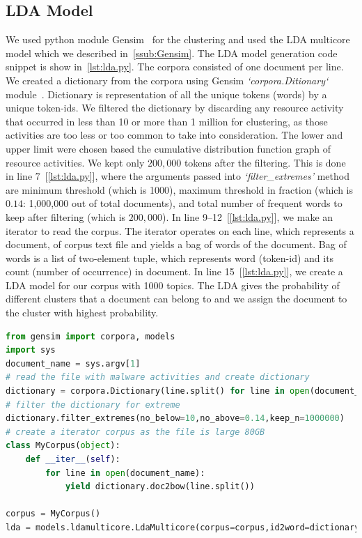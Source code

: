 \subsection{LDA Model}
\label{sub:LDA Model}
We used python module Gensim~\cite[Gensim]{gensim}  for the clustering and used the LDA multicore model which we described in~\autoref{ssub:Gensim}.
The LDA model generation code snippet is show in~\autoref{lst:lda.py}.
The corpora consisted of one document per line.
We created a dictionary from the corpora using Gensim \emph{`corpora.Ditionary`} module~\cite[]{gensimdict}.
Dictionary is representation of all the unique tokens (words) by a unique token-ids.
We filtered the dictionary by discarding any resource activity that occurred in less than 10 or more than 1 million for clustering, as those activities are too less or too common to take into consideration.
The lower and upper limit were chosen based the cumulative distribution function graph of resource activities.
We kept only $200,000$ tokens after the filtering.
This is done in line $7$~[\autoref{lst:lda.py}], where the arguments passed into \emph{`filter\_extremes'} method are minimum threshold (which is 1000), maximum threshold in fraction (which is $0.14$: 1,000,000 out of total \gettotalmalwareiii{} documents), and total number of frequent words to keep after filtering (which is $200,000$).
In line 9--12~[\autoref{lst:lda.py}], we make an iterator to read the corpus.
The iterator operates on each line, which represents a document, of corpus text file and yields a bag of words of the document.
Bag of words is a list of two-element tuple, which represents word (token-id) and its count (number of occurrence) in document.
In line 15~[\autoref{lst:lda.py}], we create a LDA model for our corpus with 1000 topics.
The LDA gives the probability of different clusters that a document can belong to and we assign the document to the cluster with highest probability.\\
\begin{lstlisting}[float,floatplacement=H,language=python,caption={Script to run Gensim LDA},label={lst:lda.py}]
from gensim import corpora, models
import sys
document_name = sys.argv[1]
# read the file with malware activities and create dictionary
dictionary = corpora.Dictionary(line.split() for line in open(document_name))
# filter the dictionary for extreme
dictionary.filter_extremes(no_below=10,no_above=0.14,keep_n=1000000)
# create a iterator corpus as the file is large 80GB
class MyCorpus(object):
    def __iter__(self):
        for line in open(document_name):
            yield dictionary.doc2bow(line.split())

corpus = MyCorpus()
lda = models.ldamulticore.LdaMulticore(corpus=corpus,id2word=dictionary,num_topics=1000)
\end{lstlisting}

